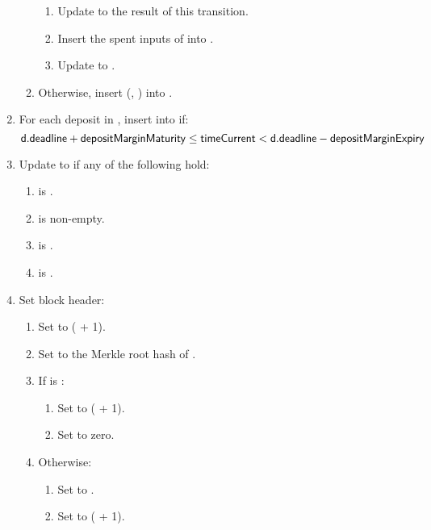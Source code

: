 \documentclass[../hydrozoa.tex]{subfiles}
\begin{document}
\begin{enumerate}
\begin{enumerate}
\begin{enumerate}
            \item Update  to the result of this transition.
            \item Insert the spent inputs of  into .
            \item Update  to .
          \end{enumerate}
        \item Otherwise, insert (, ) into .
      \end{enumerate}
  \item For each deposit  in , insert  into  if:
    \begin{equation*}
      \mathsf{d.deadline} + \mathsf{depositMarginMaturity} \leq
      \mathsf{timeCurrent} <
      \mathsf{d.deadline} - \mathsf{depositMarginExpiry}
    \end{equation*}
  \item Update  to  if any of the following hold:
    \begin{enumerate}
      \item {} is .
      \item {} is non-empty.
      \item {} is .
      \item {} is .
    \end{enumerate}
  \item Set block header:
    \begin{enumerate}
      \item Set  to ( + 1).
      \item Set  to the Merkle root hash of .
      \item If  is :
        \begin{enumerate}
          \item Set  to ( + 1).
          \item Set  to zero.
        \end{enumerate}
      \item Otherwise:
        \begin{enumerate}
          \item Set  to .
          \item Set  to ( + 1).
        \end{enumerate}
    \end{enumerate}
\end{enumerate}
\end{document}
